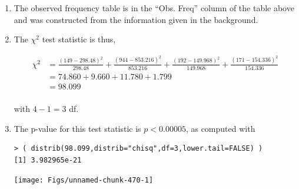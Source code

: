 \documentclass[10pt,openany]{book}\usepackage[]{graphicx}\usepackage[]{color}
\makeatletter
\newenvironment{kframe}{%
 \def\at@end@of@kframe{}%
 \ifinner\ifhmode%
  \def\at@end@of@kframe{\end{minipage}}%
  \begin{minipage}{\columnwidth}%
 \fi\fi%
 \def\FrameCommand##1{\hskip\@totalleftmargin \hskip-\fboxsep
 \colorbox{shadecolor}{##1}\hskip-\fboxsep
     \hskip-\linewidth \hskip-\@totalleftmargin \hskip\columnwidth}%
 \MakeFramed {\advance\hsize-\width
   \@totalleftmargin\z@ \linewidth\hsize
   \@setminipage}}%
 {\par\unskip\endMakeFramed%
 \at@end@of@kframe}
\newenvironment{knitrout}{}{} %
\makeatother
\begin{document}
\begin{itemize}
\begin{enumerate}
\begin{center}
\begin{tabular}{ccc}
            \hline\hline
          \end{tabular}
        \end{center}
      \item The observed frequency table is in the ``Obs. Freq'' column of the table above and was constructed from the information given in the background.
      \item The $\chi^{2}$ test statistic is thus,
        \begin{center}
          \[  \begin{split}
            \chi^{2} &= \frac{(149-298.48)^{2}}{298.48} + \frac{(944-853.216)^{2}}{853.216} + \frac{(192-149.968)^{2}}{149.968} + \frac{(171-154.336)^{2}}{154.336} \\
            &= 74.860 + 9.660 + 11.780 + 1.799 \\
            & = 98.099 \\
          \end{split}  \]
        \end{center}
        with $4-1=3$ df.
      \item The p-value for this test statistic is $p<0.00005$, as computed with
\begin{knitrout}
\color{fgcolor}\begin{kframe}
\begin{verbatim}
> ( distrib(98.099,distrib="chisq",df=3,lower.tail=FALSE) )
[1] 3.982965e-21
\end{verbatim}
\end{kframe}

{\centering \texttt{[image: Figs/unnamed-chunk-470-1]} 

}




\end{knitrout}
\end{enumerate}
\end{itemize}
\end{document}
